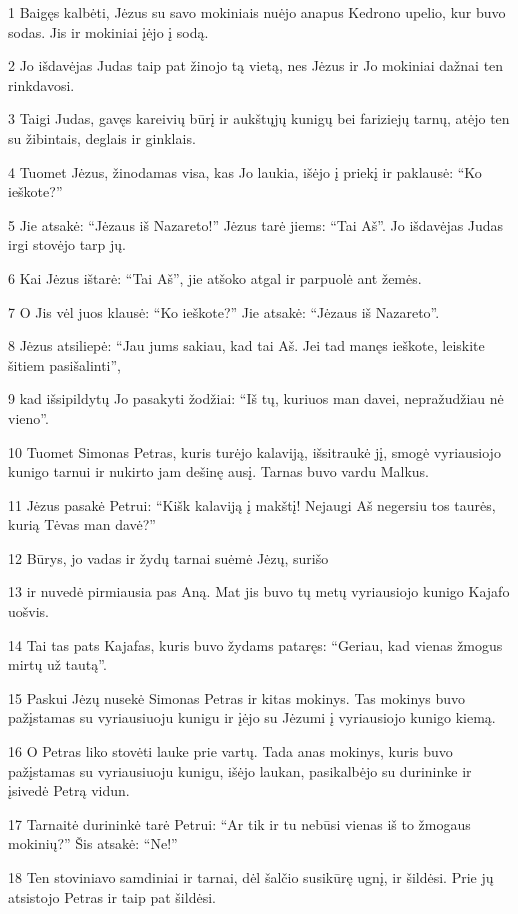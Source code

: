 \par 1 Baigęs kalbėti, Jėzus su savo mokiniais nuėjo anapus Kedrono upelio, kur buvo sodas. Jis ir mokiniai įėjo į sodą. 
\par 2 Jo išdavėjas Judas taip pat žinojo tą vietą, nes Jėzus ir Jo mokiniai dažnai ten rinkdavosi. 
\par 3 Taigi Judas, gavęs kareivių būrį ir aukštųjų kunigų bei fariziejų tarnų, atėjo ten su žibintais, deglais ir ginklais. 
\par 4 Tuomet Jėzus, žinodamas visa, kas Jo laukia, išėjo į priekį ir paklausė: “Ko ieškote?” 
\par 5 Jie atsakė: “Jėzaus iš Nazareto!” Jėzus tarė jiems: “Tai Aš”. Jo išdavėjas Judas irgi stovėjo tarp jų. 
\par 6 Kai Jėzus ištarė: “Tai Aš”, jie atšoko atgal ir parpuolė ant žemės. 
\par 7 O Jis vėl juos klausė: “Ko ieškote?” Jie atsakė: “Jėzaus iš Nazareto”. 
\par 8 Jėzus atsiliepė: “Jau jums sakiau, kad tai Aš. Jei tad manęs ieškote, leiskite šitiem pasišalinti”,­ 
\par 9 kad išsipildytų Jo pasakyti žodžiai: “Iš tų, kuriuos man davei, nepražudžiau nė vieno”. 
\par 10 Tuomet Simonas Petras, kuris turėjo kalaviją, išsitraukė jį, smogė vyriausiojo kunigo tarnui ir nukirto jam dešinę ausį. Tarnas buvo vardu Malkus. 
\par 11 Jėzus pasakė Petrui: “Kišk kalaviją į makštį! Nejaugi Aš negersiu tos taurės, kurią Tėvas man davė?” 
\par 12 Būrys, jo vadas ir žydų tarnai suėmė Jėzų, surišo 
\par 13 ir nuvedė pirmiausia pas Aną. Mat jis buvo tų metų vyriausiojo kunigo Kajafo uošvis. 
\par 14 Tai tas pats Kajafas, kuris buvo žydams pataręs: “Geriau, kad vienas žmogus mirtų už tautą”. 
\par 15 Paskui Jėzų nusekė Simonas Petras ir kitas mokinys. Tas mokinys buvo pažįstamas su vyriausiuoju kunigu ir įėjo su Jėzumi į vyriausiojo kunigo kiemą. 
\par 16 O Petras liko stovėti lauke prie vartų. Tada anas mokinys, kuris buvo pažįstamas su vyriausiuoju kunigu, išėjo laukan, pasikalbėjo su durininke ir įsivedė Petrą vidun. 
\par 17 Tarnaitė durininkė tarė Petrui: “Ar tik ir tu nebūsi vienas iš to žmogaus mokinių?” Šis atsakė: “Ne!” 
\par 18 Ten stoviniavo samdiniai ir tarnai, dėl šalčio susikūrę ugnį, ir šildėsi. Prie jų atsistojo Petras ir taip pat šildėsi. 
